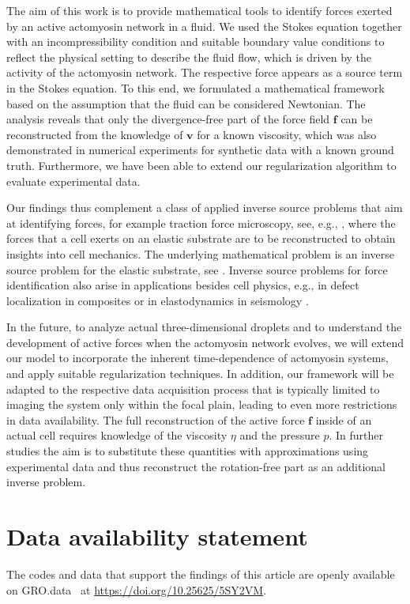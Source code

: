 \documentclass[final,leqno]{scrarticle}
\begin{document}
The aim of this work is to provide mathematical tools to identify forces exerted by an active actomyosin network in a fluid. 
We used the Stokes equation together with an incompressibility condition and suitable boundary value conditions to reflect the physical setting to describe the fluid flow, which is driven by the activity of the actomyosin network. The respective force appears as a source term in the Stokes equation. 
To this end, we formulated a mathematical framework based on the assumption that the fluid can be considered Newtonian. The analysis reveals that only the divergence-free part of the force field $\mathbf{f}$ can be reconstructed from the knowledge of $\mathbf{v}$ for a known viscosity, which was also demonstrated in numerical experiments for synthetic data with a known ground truth. Furthermore, we have been able to extend our regularization algorithm to evaluate experimental data. 

Our findings thus complement a class of applied inverse source problems that aim at identifying forces, for example traction force microscopy, see, e.g., \cite{Ambrosi2006, Schwarz2015}, 
where the forces that a cell exerts on an elastic substrate are to be reconstructed to obtain insights into cell mechanics. The underlying mathematical problem is an inverse source problem for the elastic substrate, see \cite{Sarnighausen_2025}. Inverse source problems for force identification also arise in applications besides cell physics, e.g., in defect localization in composites \cite{Binder_2015} or in elastodynamics in seismology \cite{Bao_2018}.

In the future, to analyze actual three-dimensional droplets and to understand the development of active forces when the actomyosin network evolves, we will extend our model to incorporate the inherent time-dependence of actomyosin systems, and apply suitable regularization techniques. In addition, our framework will be adapted to the respective data acquisition process that is typically limited to imaging the system only within the focal plain, leading to even more restrictions in data availability.
The full reconstruction of the active force $\mathbf{f}$ inside of an actual cell requires knowledge of the viscosity $\eta$ and the pressure $p$. In further studies the aim is to substitute these quantities with approximations using experimental data and thus reconstruct the rotation-free part as an additional inverse problem. 


\section{Data availability statement}
The codes and data that support the findings of this article are openly available on GRO.data~\cite{5SY2VM_2025} at \url{https://doi.org/10.25625/5SY2VM}.
\end{document}
